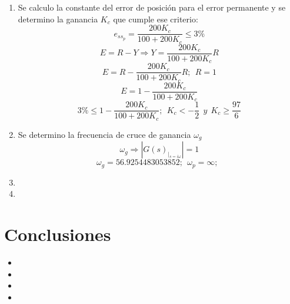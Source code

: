 \documentclass[twocolumn]{IEEEtran}
\begin{document}
\begin{enumerate}
 \item Se calculo la constante del error de posición para el error permanente y se determino la ganancia $K_c$ que cumple ese criterio:
\begin{equation}
 e_{ss_{p}}=\frac{200K_c}{100+200K_c} \leq 3\%
\label{ecu1}
\end{equation}
\begin{equation}
 E=R-Y \Longrightarrow Y=\frac{200K_c}{100+200K_c} R
\label{ecu2}
\end{equation}
\begin{equation}
 E=R-\frac{200K_c}{100+200K_c} R;\ \ R=1
\label{ecu3}
\end{equation}
\begin{equation}
 E=1-\frac{200K_c}{100+200K_c}
\label{ecu4}
\end{equation}
\begin{equation}
3 \% \leq 1-\frac{200K_c}{100+200K_c};\ \ K_c < -\frac{1}{2}\ \ y \ \ K_c \geq \frac{97}{6}
\label{ecu5}
\end{equation}
 \item Se determino la frecuencia de cruce de ganancia $\omega _g$
\begin{equation}
 \omega _g \Longrightarrow \left| {G\left( s \right)_{\left| {_{s = i\omega } } \right.} } \right| = 1
\label{ecu6}
\end{equation}
\begin{equation}
 \omega _g = 56.9254483053852;\ \ \omega _p=\infty;\ \ 
\label{ecu}
\end{equation}
\begin{equation}
 
\label{ecu}
\end{equation}
\begin{equation}
 
\label{ecu}
\end{equation}
\begin{equation}
 
\label{ecu}
\end{equation}
\begin{equation}
 
\label{ecu}
\end{equation}
 \item 

\item 
\end{enumerate}


\section{Conclusiones}
\noindent
\begin{itemize}
 \item 
 \item 
 \item 
 \item 
\end{itemize}
\end{document}
